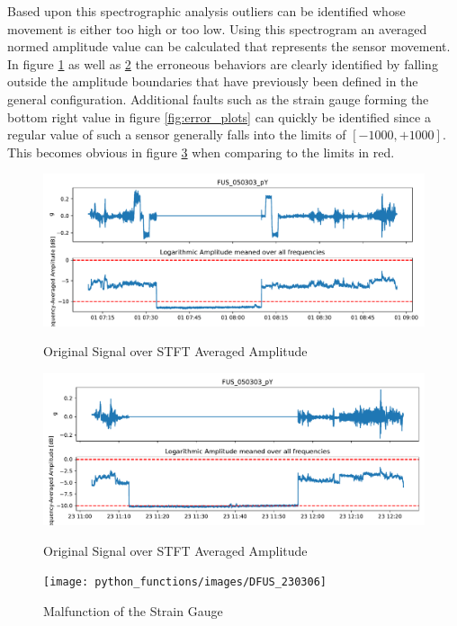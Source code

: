 Based upon this spectrographic analysis outliers can be identified whose movement is either too high or too low. Using this spectrogram an averaged normed amplitude value can be calculated that represents the sensor movement. In figure \ref{fig:results_050303_1} as well as \ref{fig:results_050303_2} the erroneous behaviors are clearly identified by falling outside the amplitude boundaries that have previously been defined in the general configuration.
Additional faults such as the strain gauge forming the bottom right value in figure \ref{fig:error_plots} can quickly be identified since a regular value of such a sensor generally falls into the limits of $[-1000, +1000]$. This becomes obvious in figure \ref{fig:results_230306} when comparing to the limits in red.
\begin{figure}
    \centering
    \includegraphics[width=\textwidth]{03_figures/python_functions/images/FUS_050303}
    \label{fig:results_050303_1}
    \caption{Original Signal over STFT Averaged Amplitude}
\end{figure}
\begin{figure}
    \centering
    \includegraphics[width=\textwidth]{03_figures/python_functions/images/FUS_050303_2}
    \label{fig:results_050303_2}
    \caption{Original Signal over STFT Averaged Amplitude}
\end{figure}
\begin{figure}
    \centering
    \texttt{[image: python\_functions/images/DFUS\_230306]}
    \caption{Malfunction of the Strain Gauge}
    \label{fig:results_230306}
\end{figure}

